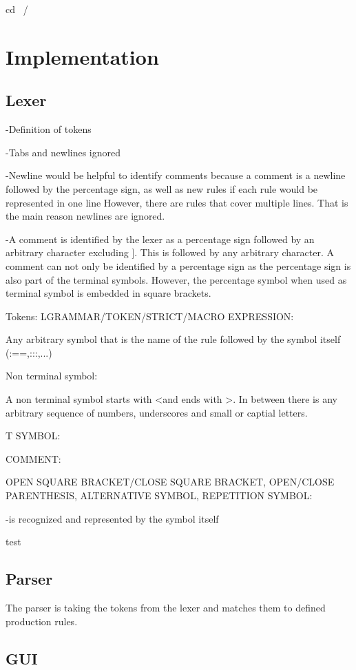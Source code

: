 cd ~/%


\chapter{Implementation}\label{cha:Implementation}

\section{Lexer}\label{sec:ImplementationLexer}

-Definition of tokens 

-Tabs and newlines ignored

-Newline would be helpful to identify comments because a comment is a newline followed by the percentage sign, as well as new rules if each rule would be represented in one line
However, there are rules that cover multiple lines. That is the main reason newlines are ignored. 

-A comment is identified by the lexer as a percentage sign followed by an arbitrary character excluding \dq ]\dq. This is followed by any arbitrary character. A comment can not only be identified by a percentage sign as the percentage sign is also part of the terminal symbols. However, the percentage symbol when used as terminal symbol is embedded in square brackets. 

Tokens:
LGRAMMAR/TOKEN/STRICT/MACRO EXPRESSION:

Any arbitrary symbol that is the name of the rule followed by the symbol itself (:==,:::,...)

Non terminal symbol:

A non terminal symbol starts with \dq <\dq and ends with \dq >\dq. In between there is any arbitrary sequence of numbers, underscores and small or captial letters.

T SYMBOL:

COMMENT:
        

OPEN SQUARE BRACKET/CLOSE SQUARE BRACKET, OPEN/CLOSE PARENTHESIS, ALTERNATIVE SYMBOL, REPETITION SYMBOL:

-is recognized and represented by the symbol itself

test
\section{Parser}\label{sec:ImplementationParser}

The parser is taking the tokens from the lexer and matches them to defined production rules.

\section{GUI}\label{sec:GUI}
